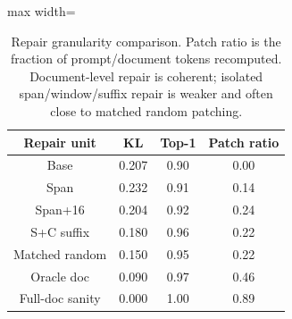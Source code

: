 \begin{table}[t]
\centering
\footnotesize
\begin{adjustbox}{max width=\linewidth}
\begin{tabular}{cccc}
\toprule
Repair unit & KL & Top-1 & Patch ratio \\
\midrule
Base & 0.207 & 0.90 & 0.00 \\
Span & 0.232 & 0.91 & 0.14 \\
Span+16 & 0.204 & 0.92 & 0.24 \\
S+C suffix & 0.180 & 0.96 & 0.22 \\
Matched random & 0.150 & 0.95 & 0.22 \\
Oracle doc & 0.090 & 0.97 & 0.46 \\
Full-doc sanity & 0.000 & 1.00 & 0.89 \\
\bottomrule
\end{tabular}
\end{adjustbox}
\caption{Repair granularity comparison. Patch ratio is the fraction of prompt/document tokens recomputed. Document-level repair is coherent; isolated span/window/suffix repair is weaker and often close to matched random patching.}
\label{tab:granularity}
\end{table}
